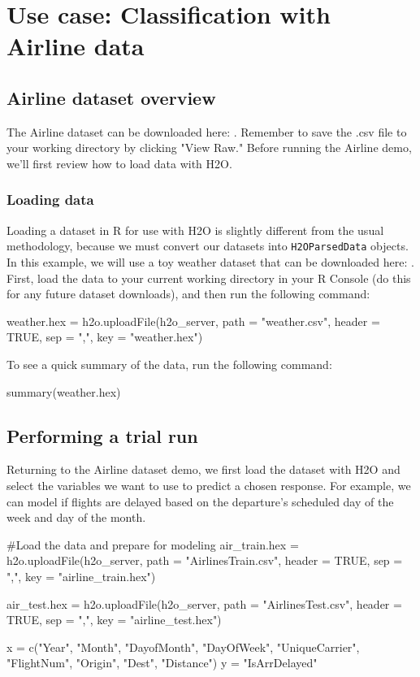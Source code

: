 \documentclass[11pt]{article}
\begin{document}
\section{Use case: Classification with Airline data} \label{3}


\subsection{Airline dataset overview} \label{3.1}

The Airline dataset can be downloaded here: . Remember to save the .csv file to your working directory by clicking  "View Raw."  Before running the Airline demo, we'll first review how to load data with H2O. 

\subsubsection{Loading data} \label{2.5}

Loading a dataset in R for use with H2O is slightly different from the usual methodology, because we must convert our datasets into \texttt{H2OParsedData} objects. In this example, we will use a toy weather dataset that can be downloaded here: . First, load the data to your current working directory in your R Console (do this for any future dataset downloads), and then run the following command:
\begin{spverbatim}
weather.hex = h2o.uploadFile(h2o_server, path = "weather.csv", header = TRUE, sep = ",", key = "weather.hex")
\end{spverbatim}
\bigskip
\noindent
To see a quick summary of the data, run the following command:
\begin{spverbatim}
summary(weather.hex)
\end{spverbatim}


\subsection{Performing a trial run} \label{3.2}
Returning to the Airline dataset demo, we first load the dataset with H2O and select the variables we want to use to predict a chosen response. For example, we can model if flights are delayed based on the departure's scheduled day of the week and day of the month.
\begin{spverbatim}

#Load the data and prepare for modeling
air_train.hex = h2o.uploadFile(h2o_server, path = "AirlinesTrain.csv", header = TRUE, sep = ",", key = "airline_train.hex")

air_test.hex = h2o.uploadFile(h2o_server, path = "AirlinesTest.csv", header = TRUE, sep = ",", key = "airline_test.hex")

x = c("Year", "Month", "DayofMonth", "DayOfWeek", "UniqueCarrier", "FlightNum", "Origin", "Dest", "Distance")
y = "IsArrDelayed" 

\end{spverbatim}
\end{document}
